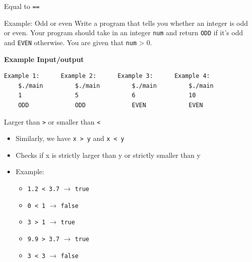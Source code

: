 \documentclass[10pt,xcolor={table,dvipsnames},t]{beamer}
\begin{document}
\begin{frame}[fragile]{Equal to \texttt{==}}
  \begin{exampleblock}{Example: Odd or even}
  Write a program that tells you whether an integer is odd or even. Your program should take in an integer \texttt{num} and return \texttt{ODD} if it's odd and \texttt{EVEN} otherwise. You are given that \texttt{num} > 0.
  \end{exampleblock}
  \textbf{Example Input/output}
\begin{lstlisting}[language=bash]
    Example 1:      Example 2:      Example 3:      Example 4:
    $./main         $./main         $./main         $./main
    1               5               6               10
    ODD             ODD             EVEN            EVEN
\end{lstlisting}
\end{frame}

\begin{frame}{Larger than \texttt{>} or smaller than \texttt{<}}
  \begin{itemize}
    \item Similarly, we have \texttt{x > y} and \texttt{x < y}
    \item Checks if x is strictly larger than y or strictly smaller than y
    \item Example:
    \begin{itemize}
      \item \texttt{1.2 < 3.7} $\rightarrow$ \texttt{true}
      \item \texttt{0 < 1} $\rightarrow$ \texttt{false}
      \item \texttt{3 > 1} $\rightarrow$ \texttt{true}
      \item \texttt{9.9 > 3.7} $\rightarrow$ \texttt{true}
      \item \texttt{3 < 3} $\rightarrow$ \texttt{false} 
    \end{itemize}
  \end{itemize}
\end{frame}
\end{document}
